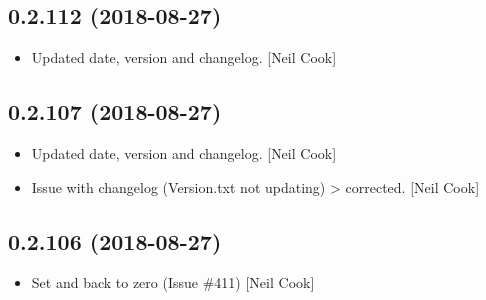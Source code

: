 \documentclass[a4paper,10pt,english]{report}
\begin{document}
\subsection{0.2.112 (2018-08-27)}
\label{\detokenize{misc/changelog:id351}}\begin{itemize}
\item {} 
Updated date, version and changelog. {[}Neil Cook{]}

\end{itemize}


\subsection{0.2.107 (2018-08-27)}
\label{\detokenize{misc/changelog:id352}}\begin{itemize}
\item {} 
Updated date, version and changelog. {[}Neil Cook{]}

\item {} 
Issue with changelog (Version.txt not updating) \textendash{}\textgreater{} corrected. {[}Neil
Cook{]}

\end{itemize}


\subsection{0.2.106 (2018-08-27)}
\label{\detokenize{misc/changelog:id353}}\begin{itemize}
\item {} 
Set  and  back to zero (Issue \#411)
{[}Neil Cook{]}

\end{itemize}
\end{document}
